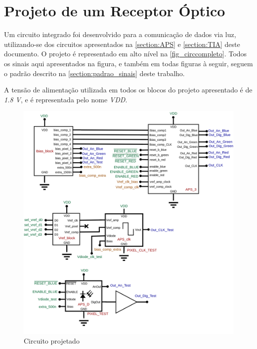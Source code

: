 \section[Projeto de um Receptor Óptico]{Projeto de um Receptor Óptico}
\label{sec_circ_comp}

Um circuito integrado foi desenvolvido para a comunicação de dados via luz, utilizando-se dos circuitos apresentados na \autoref{section:APS} e \autoref{section:TIA} deste documento. O projeto \'e representado em alto n\'ivel na \autoref{fig_circcompleto}. Todos os sinais aqui apresentados na figura, e tamb\'em em todas figuras \`a seguir, seguem o padrão descrito na \autoref{section:padrao_sinais} deste trabalho.

A tensão de alimentação utilizada em todos os blocos do projeto apresentado é de \textit{1.8 V}, e é representada pelo nome \textit{VDD}.

\begin{figure}[!h]
	\caption{\label{fig_circcompleto}Circuito projetado}
	\begin{center}
	    \includegraphics[width=\textwidth]{Circuitos/Complete_Circuit.png}
	\end{center}
\end{figure}

